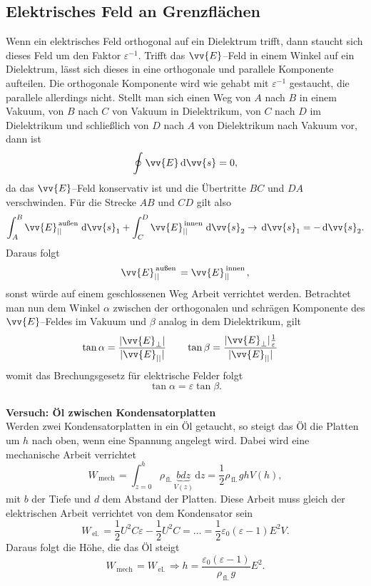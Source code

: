 \documentclass[a4paper,12pt]{article}
\newcommand{\td}{\,\text{d}}
\begin{document}
\subsection{Elektrisches Feld an Grenzflächen}
Wenn ein elektrisches Feld orthogonal auf ein Dielektrum trifft, dann staucht sich dieses Feld um den Faktor $\varepsilon ^{-1}$. Trifft das $\vv{E}$--Feld in einem Winkel auf ein Dielektrum, lässt sich dieses in eine orthogonale und parallele Komponente aufteilen. Die orthogonale Komponente wird wie gehabt mit $\varepsilon ^{-1}$ gestaucht, die parallele allerdings nicht. Stellt man sich einen Weg von $A$ nach $B$ in einem Vakuum, von $B$ nach $C$ von Vakuum in Dielektrikum, von $C$ nach $D$ im Dielektrikum und schließlich von $D$ nach $A$ von Dielektrikum nach Vakuum vor, dann ist
\[ 
        \oint_{}^{}\vv{E}\td \vv{s}=0
,\] 
da das $\vv{E}$--Feld konservativ ist und die Übertritte $BC$ und $DA$ verschwinden. Für die Strecke $AB$ und $CD$ gilt also
\begin{align*}
        \int_{A}^{B}\vv{E}_{| |}^{\,\text{außen}\,}\td \vv{s}_1+\int_{C}^{D}\vv{E}_{| |}^{\,\text{innen}\,}\td \vv{s}_2\rightarrow \td \vv{s}_1=-\td \vv{s}_2
.\end{align*}
Daraus folgt
\[ 
        \vv{E}_{| |}^{\,\text{außen}\,}=\vv{E}_{| |}^{\,\text{innen}\,}
,\] 
sonst würde auf einem geschlossenen Weg Arbeit verrichtet werden. Betrachtet man nun dem Winkel $\alpha $ zwischen der orthogonalen und schrägen Komponente des $\vv{E}$--Feldes im Vakuum und $\beta $ analog in dem Dielektrikum, gilt
\begin{align*}
        \tan \alpha &=\dfrac{|\vv{E}_{\perp}|}{|\vv{E}_{| |}|}\qquad \tan \beta =\dfrac{|\vv{E}_{\perp}|\tfrac{1}{\varepsilon }}{|\vv{E}_{| |}|}
\end{align*}
womit das Brechungsgesetz für elektrische Felder folgt
\[ 
        \tan \alpha =\varepsilon \tan \beta 
.\] 
\hfill\\\textbf{Versuch: Öl zwischen Kondensatorplatten}\\ 
Werden zwei Kondensatorplatten in ein Öl getaucht, so steigt das Öl die Platten um $h$ nach oben, wenn eine Spannung angelegt wird. Dabei wird eine mechanische Arbeit verrichtet
\[ 
        W_{\,\text{mech}\,}=\int_{z=0}^{h}\rho _{\,\text{fl.}\,}\underbrace{bdz}_{V\left(z\right)}\td z=\dfrac{1}{2}\rho _{\,\text{fl.}\,}ghV(h)
,\] 
mit $b$ der Tiefe und $d$ dem Abstand der Platten. Diese Arbeit muss gleich der elektrischen Arbeit verrichtet von dem Kondensator sein
\[ 
        W_{\,\text{el.}\,}=\dfrac{1}{2}U^2C\varepsilon -\dfrac{1}{2}U^2C=\hdots =\dfrac{1}{2}\varepsilon _0\left(\varepsilon -1\right)E^2V
.\] 
Daraus folgt die Höhe, die das Öl steigt
\[ 
        W_{\,\text{mech}\,}=W_{\,\text{el.}\,}\Rightarrow h=\dfrac{\varepsilon _0\left(\varepsilon -1\right)}{\rho _{\,\text{fl.}\,}g}E^2
.\] 
\end{document}
